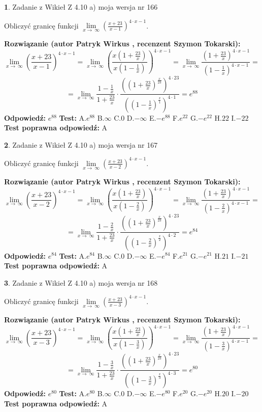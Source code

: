 \documentclass[12pt, a4paper]{article}
\theoremstyle{definition} %
\newtheorem{zad}{}
\newcommand{\zadStart}[1]{\begin{zad}#1\newline}
\newcommand{\zadStop}{\end{zad}}
\newcommand{\rozwStart}[2]{\noindent \textbf{Rozwiązanie (autor #1 , recenzent #2): }\newline}
\newcommand{\rozwStop}{\newline}
\newcommand{\odpStart}{\noindent \textbf{Odpowiedź:}\newline}
\newcommand{\odpStop}{\newline}
\newcommand{\testStart}{\noindent \textbf{Test:}\newline}
\newcommand{\testStop}{\newline}
\newcommand{\kluczStart}{\noindent \textbf{Test poprawna odpowiedź:}\newline}
\newcommand{\kluczStop}{\newline}
\begin{document}
\zadStart{Zadanie z Wikieł Z 4.10 a) moja wersja nr 166}

Obliczyć granicę funkcji  $\lim\limits_{x\to\ \infty}(\frac{x+23}{x-1})^{4\cdot x-1}$.
\zadStop
\rozwStart{Patryk Wirkus}{Szymon Tokarski}
$$\lim\limits_{x\to\ \infty}(\frac{x+23}{x-1})^{4\cdot x-1} = \lim\limits_{x\to\ \infty}(\frac{x(1+\frac{23}{x})}{x(1-\frac{1}{x})})^{4\cdot x-1}=\lim\limits_{x\to\ \infty}\frac{(1+\frac{23}{x})^{4\cdot x-1}}{(1-\frac{1}{x})^{4\cdot x-1}}=$$
$$=\lim\limits_{x\to\ \infty}\frac{1-\frac{1}{x}}{1+\frac{23}{x}}\cdot\frac{((1+\frac{23}{x})^{\frac{x}{23}})^{4\cdot23}}{((1-\frac{1}{x})^{\frac{x}{1}})^{4\cdot1}}=e^{88}$$
\rozwStop
\odpStart
$e^{88}$
\odpStop
\testStart
A.$e^{88}$ B.$\infty$ C.$0$ D.$-\infty$ E.$-e^{88}$
F.$e^{22}$ G.$-e^{22}$
H.$22$
I.$-22$
\testStop
\kluczStart
A
\kluczStop



\zadStart{Zadanie z Wikieł Z 4.10 a) moja wersja nr 167}

Obliczyć granicę funkcji  $\lim\limits_{x\to\ \infty}(\frac{x+23}{x-2})^{4\cdot x-1}$.
\zadStop
\rozwStart{Patryk Wirkus}{Szymon Tokarski}
$$\lim\limits_{x\to\ \infty}(\frac{x+23}{x-2})^{4\cdot x-1} = \lim\limits_{x\to\ \infty}(\frac{x(1+\frac{23}{x})}{x(1-\frac{2}{x})})^{4\cdot x-1}=\lim\limits_{x\to\ \infty}\frac{(1+\frac{23}{x})^{4\cdot x-1}}{(1-\frac{2}{x})^{4\cdot x-1}}=$$
$$=\lim\limits_{x\to\ \infty}\frac{1-\frac{2}{x}}{1+\frac{23}{x}}\cdot\frac{((1+\frac{23}{x})^{\frac{x}{23}})^{4\cdot23}}{((1-\frac{2}{x})^{\frac{x}{2}})^{4\cdot2}}=e^{84}$$
\rozwStop
\odpStart
$e^{84}$
\odpStop
\testStart
A.$e^{84}$ B.$\infty$ C.$0$ D.$-\infty$ E.$-e^{84}$
F.$e^{21}$ G.$-e^{21}$
H.$21$
I.$-21$
\testStop
\kluczStart
A
\kluczStop



\zadStart{Zadanie z Wikieł Z 4.10 a) moja wersja nr 168}

Obliczyć granicę funkcji  $\lim\limits_{x\to\ \infty}(\frac{x+23}{x-3})^{4\cdot x-1}$.
\zadStop
\rozwStart{Patryk Wirkus}{Szymon Tokarski}
$$\lim\limits_{x\to\ \infty}(\frac{x+23}{x-3})^{4\cdot x-1} = \lim\limits_{x\to\ \infty}(\frac{x(1+\frac{23}{x})}{x(1-\frac{3}{x})})^{4\cdot x-1}=\lim\limits_{x\to\ \infty}\frac{(1+\frac{23}{x})^{4\cdot x-1}}{(1-\frac{3}{x})^{4\cdot x-1}}=$$
$$=\lim\limits_{x\to\ \infty}\frac{1-\frac{3}{x}}{1+\frac{23}{x}}\cdot\frac{((1+\frac{23}{x})^{\frac{x}{23}})^{4\cdot23}}{((1-\frac{3}{x})^{\frac{x}{3}})^{4\cdot3}}=e^{80}$$
\rozwStop
\odpStart
$e^{80}$
\odpStop
\testStart
A.$e^{80}$ B.$\infty$ C.$0$ D.$-\infty$ E.$-e^{80}$
F.$e^{20}$ G.$-e^{20}$
H.$20$
I.$-20$
\testStop
\kluczStart
A
\kluczStop
\end{document}
